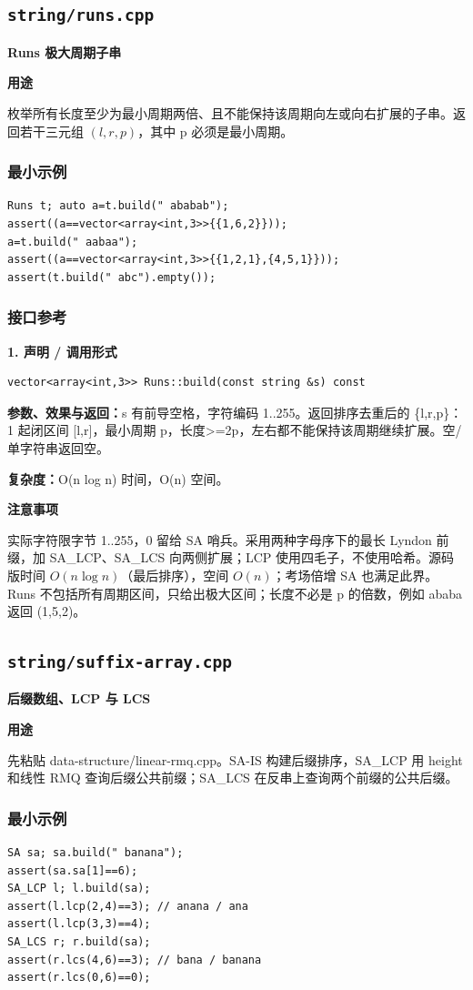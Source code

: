 \documentclass[UTF8,a4paper,10pt]{ctexart}
\newcommand{\TemplUsage}[1]{\textbf{用途}\par #1\par}
\newcommand{\TemplNote}[1]{\textbf{注意事项}\par #1\par}
\begin{document}
\subsection{\texttt{string/runs.cpp}}
\textbf{Runs 极大周期子串}\par
\TemplUsage{枚举所有长度至少为最小周期两倍、且不能保持该周期向左或向右扩展的子串。返回若干三元组 $(l,r,p)$，其中 p 必须是最小周期。}
\subsubsection*{最小示例}
\begin{lstlisting}
Runs t; auto a=t.build(" ababab");
assert((a==vector<array<int,3>>{{1,6,2}}));
a=t.build(" aabaa");
assert((a==vector<array<int,3>>{{1,2,1},{4,5,1}}));
assert(t.build(" abc").empty());
\end{lstlisting}
\subsubsection*{接口参考}
\noindent\begin{minipage}{\textwidth}
\textbf{1. 声明 / 调用形式}
\begin{lstlisting}
vector<array<int,3>> Runs::build(const string &s) const
\end{lstlisting}
\textbf{参数、效果与返回：}s 有前导空格，字符编码 1..255。返回排序去重后的 \{l,r,p\}：1 起闭区间 [l,r]，最小周期 p，长度>=2p，左右都不能保持该周期继续扩展。空/单字符串返回空。

\textbf{复杂度：}O(n log n) 时间，O(n) 空间。

\TemplNote{实际字符限字节 1..255，0 留给 SA 哨兵。采用两种字母序下的最长 Lyndon 前缀，加 SA\_LCP、SA\_LCS 向两侧扩展；LCP 使用四毛子，不使用哈希。源码版时间 $O(n\log n)$（最后排序），空间 $O(n)$；考场倍增 SA 也满足此界。Runs 不包括所有周期区间，只给出极大区间；长度不必是 p 的倍数，例如 ababa 返回 (1,5,2)。}
\end{minipage}\par\vspace{0.4em}
\clearpage
\subsection{\texttt{string/suffix-array.cpp}}
\textbf{后缀数组、LCP 与 LCS}\par
\TemplUsage{先粘贴 data-structure/linear-rmq.cpp。SA-IS 构建后缀排序，SA\_LCP 用 height 和线性 RMQ 查询后缀公共前缀；SA\_LCS 在反串上查询两个前缀的公共后缀。}
\subsubsection*{最小示例}
\begin{lstlisting}
SA sa; sa.build(" banana");
assert(sa.sa[1]==6);
SA_LCP l; l.build(sa);
assert(l.lcp(2,4)==3); // anana / ana
assert(l.lcp(3,3)==4);
SA_LCS r; r.build(sa);
assert(r.lcs(4,6)==3); // bana / banana
assert(r.lcs(0,6)==0);
\end{lstlisting}
\end{document}
